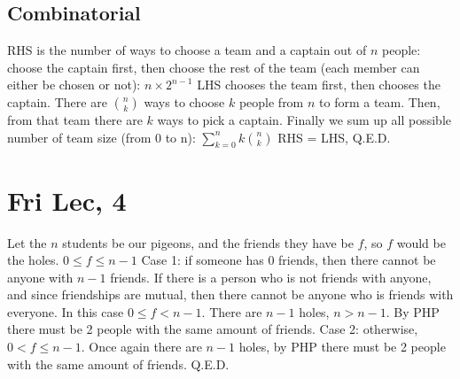 \documentclass[12pt]{article}
\begin{document}
\subsection{Combinatorial}
RHS is the number of ways to choose a team and a captain out of $n$ people: choose the captain first, then choose the rest of the team (each member can either be chosen or not): $n \times 2^{n-1}$
\newline
LHS chooses the team first, then chooses the captain. There are $\binom{n}{k}$ ways to choose $k$ people from $n$ to form a team. Then, from that team there are $k$ ways to pick a captain. Finally we sum up all possible number of team size (from 0 to n): $\sum_{k=0}^{n}k\binom{n}{k}$
\newline
RHS = LHS, Q.E.D.


\section{Fri Lec, 4}
Let the $n$ students be our pigeons, and the friends they have be $f$, so $f$ would be the holes. $0 \leq f \leq n-1$
\newline
Case 1: if someone has $0$ friends, then there cannot be anyone with $n-1$ friends. If there is a person who is not friends with anyone, and since friendships are mutual, then there cannot be anyone who is friends with everyone. In this case $0 \leq f < n-1$. There are $n-1$ holes, $n > n-1$. By PHP there must be 2 people with the same amount of friends.
\newline
Case 2: otherwise, $0 < f \leq n-1$. Once again there are $n-1$ holes, by PHP there must be 2 people with the same amount of friends.
\newline
Q.E.D.
\end{document}
